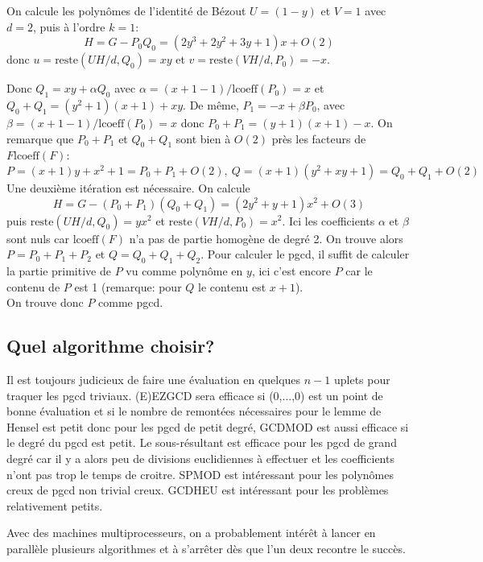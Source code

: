 \documentclass[a4paper,11pt]{article}
\begin{document}
\begin{giacjshere}
On calcule les polynômes de l'identité de Bézout $U = ( 1 - y )$ et $V = 1$
avec $d = 2$, puis à l'ordre $k = 1$:
\[ H = G - P_0 Q_0 = ( 2 y^3 + 2 y^2 + 3 y + 1 ) x + O ( 2 ) \]
donc $u = \mbox{reste} ( U H / d, Q_0 ) = x y$ et $v = \mbox{reste} ( V H / d,
P_0 ) = - x$.

Donc $Q_1 = x y + \alpha Q_0$ avec $\alpha = ( x + 1 - 1 ) / \mbox{lcoeff} (
P_0 ) = x$ et $Q_0 + Q_1 = ( y^2 + 1 ) ( x + 1 ) + x y$. De
même, $P_1 = - x + \beta P_0$, avec $\beta = ( x + 1 - 1 ) / \mbox{lcoeff} (
P_0 ) = x$ donc $P_0 + P_1 = ( y + 1 ) ( x + 1 ) - x$. On remarque que $P_0 +
P_1$ et $Q_0 + Q_1$ sont bien à $O ( 2 )$ près les facteurs de $F
\mbox{lcoeff} ( F )$:
\[ P = ( x + 1 ) y + x^2 + 1 = P_0 + P_1 + O ( 2 ), \ Q = ( x +
   1 ) ( y^2 + x y + 1 ) = Q_0 + Q_1 + O ( 2 ) \]
Une deuxième itération est nécessaire. On calcule
\[ H = G - ( P_0 + P_1 ) ( Q_0 + Q_1 ) = ( 2 y^2 + y + 1 ) x^2 + O ( 3
   ) \]
puis $\mbox{reste} ( U H / d, Q_0 ) = y x^2$ et $\mbox{reste} ( V H / d, P_0 )
= x^2$. Ici les coefficients $\alpha$ et $\beta$ sont nuls car $\mbox{lcoeff}
( F )$ n'a pas de partie homogène de degré 2. On trouve alors $P = P_0 + P_1 +
P_2$ et $Q = Q_0 + Q_1 + Q_2$. Pour calculer le pgcd, il suffit de calculer la
partie primitive de $P$ vu comme polynôme en $y$, ici c'est encore $P$ car le
contenu de $P$ est 1 (remarque: pour $Q$ le contenu est $x + 1$).\\
On trouve donc $P$ comme pgcd.

\subsection{Quel algorithme choisir?}

Il est toujours judicieux de faire une évaluation en quelques $n - 1$ uplets
pour traquer les pgcd triviaux. (E)EZGCD sera efficace si (0,...,0) est un
point de bonne évaluation et si le nombre de remontées nécessaires pour le
lemme de Hensel est petit donc pour les pgcd de petit degré, GCDMOD est aussi
efficace si le degré du pgcd est petit. Le sous-résultant est efficace pour
les pgcd de grand degré car il y a alors peu de divisions euclidiennes à
effectuer et les coefficients n'ont pas trop le temps de croitre. SPMOD est
intéressant pour les polynômes creux de pgcd non trivial creux. GCDHEU est
intéressant pour les problèmes relativement petits.

Avec des machines multiprocesseurs, on a probablement intérêt à lancer en
parallèle plusieurs algorithmes et à s'arrêter dès que l'un deux recontre le
succès.


\end{giacjshere}
\end{document}
